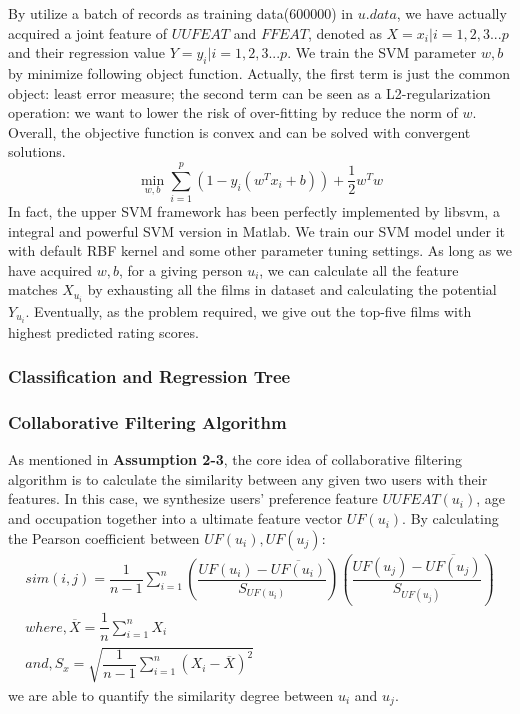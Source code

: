 By utilize a batch of records as training data(600000) in $u.data$, we have actually acquired a joint feature of $UUFEAT$ and $FFEAT$, denoted as $\textit{X}={x_{i}|i=1,2,3...p}$ and their regression value $\textit{Y}={y_{i}|i=1,2,3...p}$. We train the SVM parameter $w,b$ by minimize following object function. Actually, the first term is just the common object: least error measure; the second term can be seen as a L2-regularization operation: we want to lower the risk of over-fitting by reduce the norm of $w$. Overall, the objective function is convex and can be solved with convergent solutions.
\begin{equation}
\min _{w,b}\sum ^{p}_{i=1}\left( 1-y_{i}\left( w^{T}x_{i}+b\right) \right) +\dfrac {1}{2}w^{T}w
\end{equation}
In fact, the upper SVM framework has been perfectly implemented by libsvm\cite{chang2011libsvm}, a integral and powerful SVM version in Matlab. We train our SVM model under it with default RBF kernel\cite{chung2003radius} and some other parameter tuning settings. As long as we have acquired $w,b$, for a giving person $u_{i}$, we can calculate all the feature matches $X_{u_{i}}$ by exhausting all the films in dataset and calculating the potential $Y_{u_{i}}$. Eventually, as the problem required, we give out the top-five films with highest predicted rating scores.

\subsubsection{Classification and Regression Tree}
\subsubsection{Collaborative Filtering Algorithm}
As mentioned in \textbf{Assumption 2-3}, the core idea of collaborative filtering algorithm is to calculate the similarity between any given two users with their features. In this case, we synthesize users' preference feature $UUFEAT(u_{i})$, age and occupation together into a ultimate feature vector $UF(u_{i})$. By calculating the Pearson coefficient\cite{hane1993pearson} between $UF(u_{i}), UF(u_{j})$:
\begin{eqnarray}
sim\left(i,j\right) =\dfrac {1}{n-1}\sum ^{n}_{i=1}\left( \dfrac {UF(u_{i})-\overline {UF(u_{i})}}{S_{UF(u_{i})}}\right) \left( \dfrac {UF(u_{j})-\overline {UF(u_{j})}}{S_{UF(u_{j})}}\right) \\
where, \overline {X}=\dfrac {1}{n}\sum ^{n}_{i=1}X_{i} \nonumber \\ 
and, S_{x}=\sqrt {\dfrac {1}{n-1}\sum ^{n}_{i=1}\left( X_{i}-\overline {X}\right) ^{2}} \nonumber 
\end{eqnarray}
we are able to quantify the similarity degree between $u_{i}$ and $u_{j}$.

